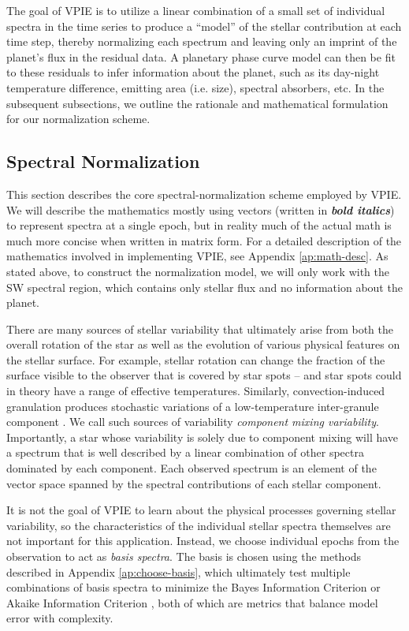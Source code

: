 \documentclass[twocolumn,linenumbers]{aastex7}
\newcommand{\update}[1]{\textcolor{blue}{\bf #1}}
\begin{document}
The goal of VPIE is to utilize a linear combination of a small set of individual spectra in the time series to produce a ``model'' of the stellar contribution at each time step, thereby normalizing each spectrum and leaving only an imprint of the planet's flux in the residual data. A planetary phase curve model can then be fit to these residuals to infer information about the planet, such as its day-night temperature difference, emitting area (i.e. size), spectral absorbers, etc. In the subsequent subsections, we outline the rationale and mathematical formulation for our normalization scheme.

\subsection{Spectral Normalization}\label{sec:change-basis}

This section describes the core spectral-normalization scheme employed by VPIE. We will describe the mathematics mostly using vectors (written in {\bf \em bold italics}) to represent spectra at a single epoch, but in reality much of the actual math is much more concise when written in matrix form. For a detailed description of the mathematics involved in implementing VPIE, see Appendix \ref{ap:math-desc}. As stated above, to construct the normalization model, we will only work with the SW spectral region, which contains only stellar flux and no information about the planet.

There are many sources of stellar variability that ultimately arise from both the overall rotation of the star as well as the evolution of various physical features on the stellar surface. For example, stellar rotation can change the fraction of the surface visible to the observer that is covered by star spots -- and star spots could in theory have a range of effective temperatures. Similarly, convection-induced granulation produces stochastic variations of a low-temperature inter-granule component \update{\citep[e.g.,][]{kallinger2014,coulombe2025}}. We call such sources of variability {\em component mixing variability}. Importantly, a star whose variability is solely due to component mixing will have a spectrum that is well described by a linear combination of other spectra dominated by each component. Each observed spectrum is an element of the vector space spanned by the spectral contributions of each stellar component.

It is not the goal of VPIE to learn about the physical processes governing stellar variability, so the characteristics of the individual stellar spectra themselves are not important for this application. Instead, we choose individual epochs from the observation to act as {\em basis spectra}. The basis is chosen using the methods described in Appendix \ref{ap:choose-basis}, which ultimately test multiple combinations of basis spectra to minimize the Bayes Information Criterion \citep[BIC,][]{schwarz1978} or Akaike Information Criterion \citep[AIC,][]{akaike1974}, both of which are metrics that balance model error with complexity.
\end{document}
